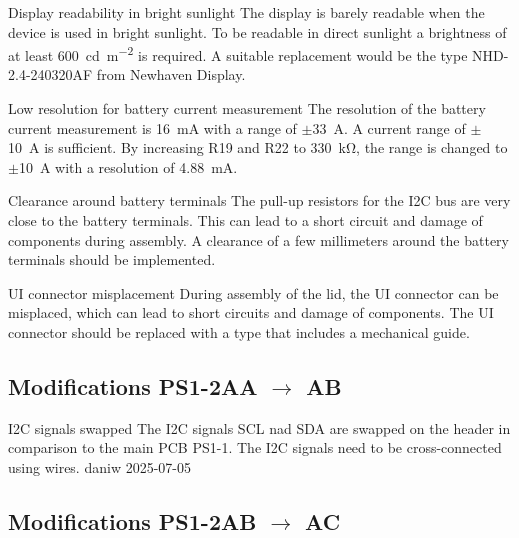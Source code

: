 \begin{ModTable}
\ModItemOpen
{Display readability in bright sunlight}
{The display is barely readable when the device is used in bright sunlight. }
{To be readable in direct sunlight a brightness of at least \qty{600}{\candela\per\square\meter} is required. A suitable replacement would be the type NHD-2.4-240320AF from Newhaven Display. }
{}
{}

\ModItemOpen
{Low resolution for battery current measurement}
{The resolution of the battery current measurement is \qty{16}{\milli\ampere} with a range of $\pm$\qty{33}{\ampere}. A current range of $\pm$\qty{10}{\ampere} is sufficient. }
{By increasing R19 and R22 to \qty{330}{\kilo\ohm}, the range is changed to $\pm$\qty{10}{\ampere} with a resolution of \qty{4.88}{\milli\ampere}. }
{}
{}

\ModItemOpen
{Clearance around battery terminals}
{The pull-up resistors for the I2C bus are very close to the battery terminals. This can lead to a short circuit and damage of components during assembly. }
{A clearance of a few millimeters around the battery terminals should be implemented. }
{}
{}

\ModItemOpen
{\acs{UI} connector misplacement}
{During assembly of the lid, the \ac{UI} connector can be misplaced, which can lead to short circuits and damage of components. }
{The \ac{UI} connector should be replaced with a type that includes a mechanical guide. }
{}
{}

\end{ModTable}

\FloatBarrier

\subsection{Modifications PS1-2AA $\to$ AB}

\begin{ModTable}

\ModItemDone
{\acs{I2C} signals swapped}
{The \ac{I2C} signals SCL nad SDA are swapped on the header in comparison to the main PCB PS1-1. }
{The \ac{I2C} signals need to be cross-connected using wires. }
{daniw}
{2025-07-05}

\end{ModTable}

\FloatBarrier

\subsection{Modifications PS1-2AB $\to$ AC}

